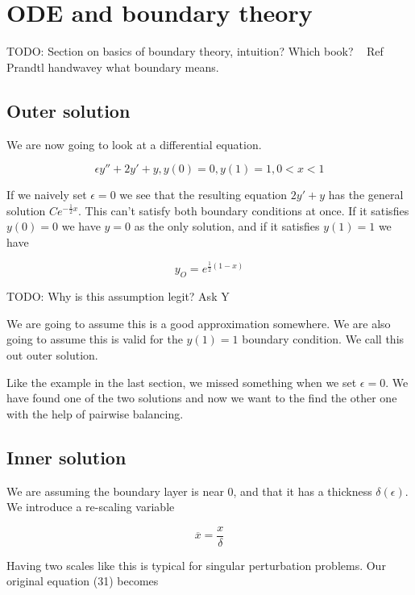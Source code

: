 \documentclass[12pt]{article}
\begin{document}
\section{ODE and boundary theory}

TODO: Section on basics of boundary theory, intuition? Which book? ~ Ref Prandtl
handwavey what boundary means.

\subsection{Outer solution}

We are now going to look at a differential equation.

\begin{equation}
\epsilon y'' + 2 y' + y, y(0)=0, y(1)=1, 0 < x < 1
\end{equation}

If we naively set $\epsilon = 0$ we see that the resulting equation $2 y' + y$
has the general solution $C e^{- \frac{1}{2}x}$. This can't satisfy both
boundary conditions at once. If it satisfies $y(0)=0$ we have $y=0$ as the only
solution, and if it satisfies $y(1)=1$ we have

\begin{equation}
y_O=e^{\frac{1}{2} (1 - x)}
\end{equation}

TODO: Why is this assumption legit? Ask Y

We are going to assume this is a good approximation somewhere. We are also going
to assume this is valid for the $y(1)=1$ boundary condition. We call this out
outer solution.

Like the example in the last section, we missed something when we set $\epsilon
= 0$. We have found one of the two solutions and now we want to the find the
other one with the help of pairwise balancing.

\subsection{Inner solution}

We are assuming the boundary layer is near 0, and that it has a thickness
$\delta(\epsilon)$. We introduce a re-scaling variable

\begin{equation}
\overline{x} = \frac{x}{\delta}
\end{equation}

Having two scales like this is typical for singular perturbation problems. Our
original equation (31) becomes
\end{document}
